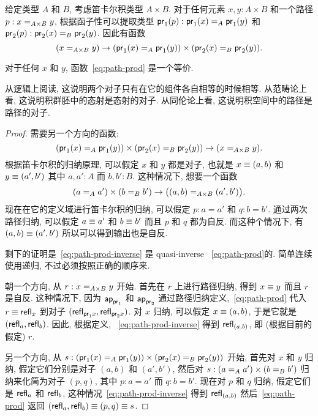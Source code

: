 %
给定类型 $A$ 和 $B$, 考虑笛卡尔积类型 $A \times B$.
对于任何元素 $x,y:A\times B$ 和一个路径 $p:\id[A\times B]{x}{y}$, 根据函子性可以提取类型 $\ap{\proj1}p:\id[A]{\proj1(x)}{\proj1(y)}$ 和 $\ap{\proj2}p:\id[B]{\proj2(x)}{\proj2(y)}$.
因此有函数
\begin{equation}\label{eq:path-prod}
  (\id[A\times B]{x}{y}) \to (\id[A]{\proj1(x)}{\proj1(y)}) \times (\id[B]{\proj2(x)}{\proj2(y)}).
\end{equation}

\begin{thm}\label{thm:path-prod}
  对于任何 $x$ 和 $y$, 函数~\eqref{eq:path-prod} 是一个等价.
\end{thm}

从逻辑上阅读, 这说明两个对子只有在它的组件各自相等的时候相等.
从范畴论上看, 这说明积群胚中的态射是态射的对子.
从同伦论上看, 这说明积空间中的路径是路径的对子.

\begin{proof}
  需要另一个方向的函数:
  \begin{equation}
    (\id[A]{\proj1(x)}{\proj1(y)}) \times (\id[B]{\proj2(x)}{\proj2(y)}) \to (\id[A\times B]{x}{y}). \label{eq:path-prod-inverse}
  \end{equation}
  根据笛卡尔积的归纳原理, 可以假定 $x$ 和 $y$ 都是对子, 也就是 $x\jdeq (a,b)$ 和 $y\jdeq (a',b')$ 其中 $a,a':A$ 而 $b,b':B$.
  这种情况下, 想要一个函数
  \begin{equation*}
    (\id[A]{a}{a'}) \times (\id[B]{b}{b'}) \to \big(\id[A\times B]{(a,b)}{(a',b')}\big).
  \end{equation*}
  现在在它的定义域进行笛卡尔积的归纳, 可以假定 $p:a=a'$ 和 $q:b=b'$.
  通过两次路径归纳, 可以假定 $a\jdeq a'$ 和 $b\jdeq b'$ 而且 $p$ 和 $q$ 都为自反.
  而这种个情况下, 有 $(a,b)\jdeq(a',b')$ 所以可以得到输出也是自反.

  剩下的证明是~\eqref{eq:path-prod-inverse} 是 quasi-inverse ~\eqref{eq:path-prod}的.
  简单连续使用递归, 不过必须按照正确的顺序来.

  朝一个方向, 从 $r:\id[A\times B]{x}{y}$ 开始.
  首先在 $r$ 上进行路径归纳, 得到 $x\jdeq y$ 而且 $r$ 是自反.
  这种情况下, 因为 $\apfunc{\proj1}$ 和 $\apfunc{\proj2}$ 通过路径归纳定义,~\eqref{eq:path-prod} 代入 $r\jdeq \refl{x}$ 到对子 $(\refl{\proj1x},\refl{\proj2x})$.
  对 $x$ 归纳, 可以假定 $x\jdeq (a,b)$, 于是它就是 $(\refl a, \refl b)$.
  因此, 根据定义, ~\eqref{eq:path-prod-inverse} 得到 $\refl{(a,b)}$, 即 (根据目前的假定) $r$.

  另一个方向, 从 $s:(\id[A]{\proj1(x)}{\proj1(y)}) \times (\id[B]{\proj2(x)}{\proj2(y)})$ 开始, 首先对 $x$ 和 $y$ 归纳, 假定它们分别是对子 $(a,b)$ 和 $(a',b')$, 然后对 $s:(\id[A]{a}{a'}) \times (\id[B]{b}{b'})$ 归纳来化简为对子 $(p,q)$, 其中 $p:a=a'$ 而 $q:b=b'$.
  现在对 $p$ 和 $q$ 归纳, 假定它们是 $\refl a$ 和 $\refl b$, 这种情况~\eqref{eq:path-prod-inverse} 得到 $\refl{(a,b)}$ 然后~\eqref{eq:path-prod} 返回 $(\refl a,\refl b)\jdeq (p,q)\jdeq s$.
\end{proof}

